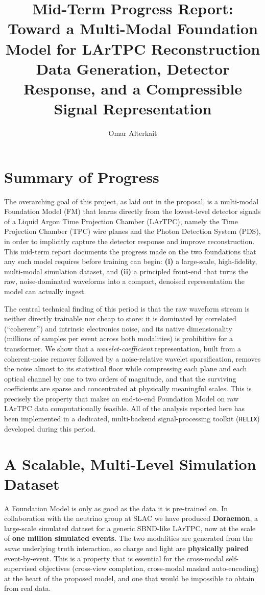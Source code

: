 \documentclass[11pt]{article}
\title{Mid-Term Progress Report:\\[2pt]
Toward a Multi-Modal Foundation Model for LArTPC Reconstruction\\[4pt]
\large Data Generation, Detector Response, and a Compressible Signal Representation}
\author{Omar Alterkait}
\date{}
\begin{document}
\maketitle

\section{Summary of Progress}
The overarching goal of this project, as laid out in the proposal, is a multi-modal
Foundation Model (FM) that learns directly from the lowest-level detector signals of a
Liquid Argon Time Projection Chamber (LArTPC), namely the Time Projection Chamber (TPC) wire
planes and the Photon Detection System (PDS), in order to implicitly capture the detector
response and improve reconstruction. This mid-term report documents the progress made on
the two foundations that any such model requires before training can begin: \textbf{(i)} a
large-scale, high-fidelity, multi-modal simulation dataset, and \textbf{(ii)} a
principled front-end that turns the raw, noise-dominated waveforms into a compact,
denoised representation the model can actually ingest.

The central technical finding of this period is that the raw waveform stream is neither
directly trainable nor cheap to store: it is dominated by correlated (``coherent'') and
intrinsic electronics noise, and its native dimensionality (millions of samples per event
across both modalities) is prohibitive for a transformer. We show that a
\emph{wavelet-coefficient} representation, built from a coherent-noise remover followed by
a noise-relative wavelet sparsification, removes the noise almost to its statistical floor
while compressing each plane and each optical channel by one to two orders of magnitude, and
that the surviving coefficients are sparse and concentrated at physically meaningful scales.
This is precisely the property that makes an end-to-end Foundation Model on raw LArTPC data
computationally feasible. All of the analysis reported here has been implemented in a
dedicated, multi-backend signal-processing toolkit (\texttt{HELIX}) developed during this
period.

\section{A Scalable, Multi-Level Simulation Dataset}
A Foundation Model is only as good as the data it is pre-trained on. In collaboration with
the neutrino group at SLAC we have produced \textbf{Doraemon}, a large-scale simulated
dataset for a generic SBND-like LArTPC, now at the scale of \textbf{one million simulated
events}. The two modalities are generated from the \emph{same} underlying truth
interaction, so charge and light are \textbf{physically paired} event-by-event. This is a
property that is essential for the cross-modal self-supervised objectives (cross-view
completion, cross-modal masked auto-encoding) at the heart of the proposed model, and one
that would be impossible to obtain from real data.
\end{document}
